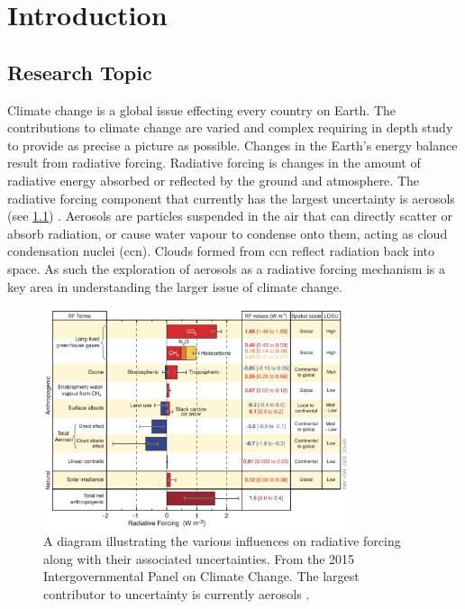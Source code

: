 \chapter{Introduction}
\label{ch:intro}


\section{Research Topic}
\label{sec:restop}

Climate change is a global issue effecting every country on Earth. The contributions to climate change are varied and complex requiring in depth study to provide as precise a picture as possible. Changes in the Earth's energy balance result from radiative forcing. Radiative forcing is changes in the amount of radiative energy absorbed or reflected by the ground and atmosphere. The radiative forcing component that currently has the largest uncertainty is aerosols (see \cref{fig:radforc}) \citep{intergovernmentalpanelonclimatechange:2015fa}. Aerosols are particles suspended in the air that can directly scatter or absorb radiation, or cause water vapour to condense onto them, acting as cloud condensation nuclei (\gls{ccn}). Clouds formed from \gls{ccn} reflect radiation back into space. As such the exploration of aerosols as a radiative forcing mechanism is a key area in understanding the larger issue of climate change.

\begin{figure}[!htb]
 	\centering
 	\includegraphics[width=0.8\textwidth,natwidth=1730,natheight=1248]{Fig/Literature_Review/Radiative_Forcing.png}
 	\caption{A diagram illustrating the various influences on radiative forcing along with their associated uncertainties. From the 2015 Intergovernmental Panel on Climate Change. The largest contributor to uncertainty is currently aerosols \citep{intergovernmentalpanelonclimatechange:2015fa}.}
 	\label{fig:radforc}
\end{figure}

